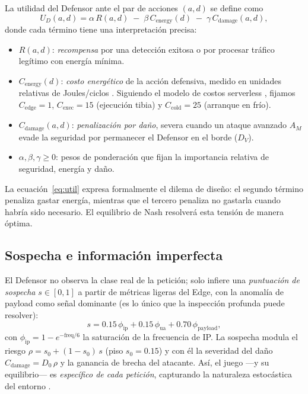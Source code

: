 \documentclass[10pt,twocolumn]{article}
\begin{document}
La utilidad del Defensor ante el par de acciones $(a,d)$ se define como
\begin{equation}
\label{eq:util}
U_D(a,d) = \alpha\, R(a,d) \;-\; \beta\, C_{\text{energy}}(d) \;-\; \gamma\, C_{\text{damage}}(a,d),
\end{equation}
donde cada t\'ermino tiene una interpretaci\'on precisa:
\begin{itemize}\itemsep2pt
  \item $R(a,d)$: \emph{recompensa} por una detecci\'on exitosa o por procesar
        tr\'afico leg\'itimo con energ\'ia m\'inima.
  \item $C_{\text{energy}}(d)$: \emph{costo energ\'etico} de la acci\'on defensiva,
        medido en unidades relativas de Joules/ciclos \cite{murugesan}. Siguiendo el
        modelo de costos serverless \cite{castro}, fijamos
        $C_{\text{edge}}=1$, $C_{\text{exec}}=15$ (ejecuci\'on tibia) y
        $C_{\text{cold}}=25$ (arranque en fr\'io).
  \item $C_{\text{damage}}(a,d)$: \emph{penalizaci\'on por da\~no}, severa cuando un
        ataque avanzado $A_M$ evade la seguridad por permanecer el Defensor en el
        borde ($D_V$).
  \item $\alpha,\beta,\gamma \ge 0$: pesos de ponderaci\'on que fijan la
        importancia relativa de seguridad, energ\'ia y da\~no.
\end{itemize}
La ecuaci\'on~\eqref{eq:util} expresa formalmente el dilema de dise\~no: el segundo
t\'ermino penaliza gastar energ\'ia, mientras que el tercero penaliza no gastarla
cuando habr\'ia sido necesario. El equilibrio de Nash resolver\'a esta tensi\'on de
manera \'optima.

\subsection{Sospecha e informaci\'on imperfecta}
El Defensor no observa la clase real de la petici\'on; solo infiere una
\emph{puntuaci\'on de sospecha} $s\in[0,1]$ a partir de m\'etricas ligeras del Edge,
con la anomal\'ia de payload como se\~nal dominante (es lo \'unico que la inspecci\'on
profunda puede resolver):
\begin{equation}
s = 0.15\,\phi_{\text{ip}} + 0.15\,\phi_{\text{ua}} + 0.70\,\phi_{\text{payload}},
\end{equation}
con $\phi_{\text{ip}}=1-e^{-\text{freq}/6}$ la saturaci\'on de la frecuencia de IP.
La sospecha modula el riesgo $\rho = s_0 + (1-s_0)\,s$ (piso $s_0=0.15$) y con \'el la
severidad del da\~no $C_{\text{damage}}=D_0\,\rho$ y la ganancia de brecha del
atacante. As\'i, el juego ---y su equilibrio--- es \emph{espec\'ifico de cada
petici\'on}, capturando la naturaleza estoc\'astica del entorno \cite{alpcan}.
\end{document}
